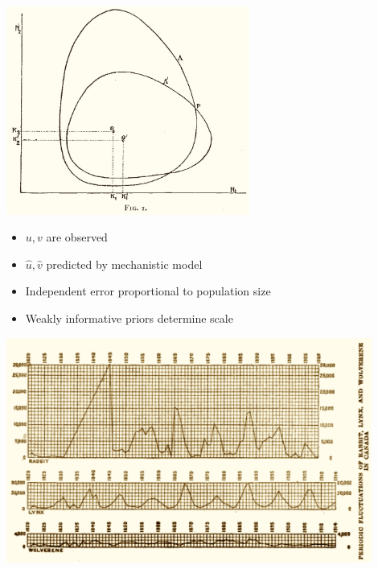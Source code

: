 \documentclass[9pt]{report}
\begin{document}
\begin{center}
\includegraphics[width=0.6\textwidth]{img/volterra-solutions.jpg}
\end{center}

\begin{itemize}
\item $u, v$ are observed
\item $\hat{u}, \hat{v}$ predicted by mechanistic model
\item Independent error proportional to population size
\item Weakly informative priors determine scale
\end{itemize}

\begin{center}
\includegraphics[width=0.9\textwidth]{img/hudons-bay-data.png}
\end{center}
\end{document}
